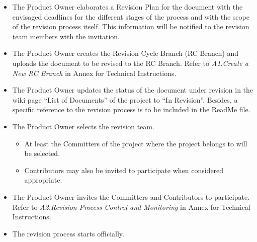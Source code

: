 \documentclass{template/openetcs_article}
\begin{document}
\begin{itemize}
\item The Product Owner elaborates a Revision Plan for the document with the envisaged deadlines for the different stages of the process and with the scope of the revision process itself. This information will be notified to the revision team members with the invitation.
\item The Product Owner creates the Revision Cycle Branch (RC Branch) and uploads the document to be revised to the RC Branch. Refer to {\it A1.Create a New RC Branch} in Annex for Technical Instructions.
\item                                                                                                                                                                     The Product Owner updates the status of the document under revision in the wiki page “List of Documents” of the project to “In Revision”. Besides, a specific reference to the revision process is to be included in the ReadMe file.  
\item The Product Owner selects the revision team. 
\begin{itemize}
\item At least the Committers of the project where the project belongs to will be selected.
\item Contributors may also be invited to participate when considered appropriate.
\end{itemize}
\item The Product Owner invites the Committers and Contributors to participate. Refer to {\it A2.Revision Process-Control and Monitoring} in Annex for Technical Instructions.
\item The revision process starts officially.
\end{itemize}
\end{document}
